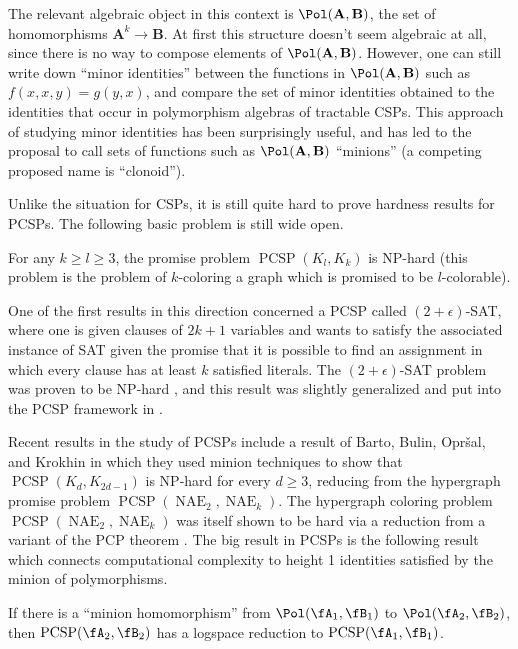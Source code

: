 The relevant algebraic object in this context is $\Pol(\mathbf{A},\mathbf{B})$, the set of homomorphisms $\mathbf{A}^k \rightarrow \mathbf{B}$. At first this structure doesn't seem algebraic at all, since there is no way to compose elements of $\Pol(\mathbf{A},\mathbf{B})$. However, one can still write down ``minor identities'' between the functions in $\Pol(\mathbf{A},\mathbf{B})$ such as $f(x,x,y) = g(y,x)$, and compare the set of minor identities obtained to the identities that occur in polymorphism algebras of tractable CSPs. This approach of studying minor identities has been surprisingly useful, and has led to the proposal to call sets of functions such as $\Pol(\mathbf{A},\mathbf{B})$ ``minions'' (a competing proposed name is ``clonoid'').

Unlike the situation for CSPs, it is still quite hard to prove hardness results for PCSPs. The following basic problem is still wide open.

\begin{conj} For any $k \ge l \ge 3$, the promise problem $\operatorname{PCSP}(K_l,K_k)$ is NP-hard (this problem is the problem of $k$-coloring a graph which is promised to be $l$-colorable).
\end{conj}

One of the first results in this direction concerned a PCSP called $(2+\epsilon)$-SAT, where one is given clauses of $2k+1$ variables and wants to satisfy the associated instance of SAT given the promise that it is possible to find an assignment in which every clause has at least $k$ satisfied literals. The $(2+\epsilon)$-SAT problem was proven to be NP-hard \cite{2+epsilon}, and this result was slightly generalized and put into the PCSP framework in \cite{pcsp-symmetric-boolean}.

Recent results in the study of PCSPs include a result of Barto, Bulin, Opr\v{s}al, and Krokhin \cite{pcsp-coloring-full} in which they used minion techniques to show that $\operatorname{PCSP}(K_d, K_{2d-1})$ is NP-hard for every $d \ge 3$, reducing from the hypergraph promise problem $\operatorname{PCSP}(\operatorname{NAE}_2,\operatorname{NAE}_k)$. The hypergraph coloring problem $\operatorname{PCSP}(\operatorname{NAE}_2,\operatorname{NAE}_k)$ was itself shown to be hard via a reduction from a variant of the PCP theorem \cite{hypergraph-promise-hardness}. The big result in PCSPs is the following result which connects computational complexity to height 1 identities satisfied by the minion of polymorphisms.

\begin{thm} If there is a ``minion homomorphism'' from $\Pol(\fA_1,\fB_1)$ to $\Pol(\fA_2,\fB_2)$, then $\operatorname{PCSP}(\fA_2,\fB_2)$ has a logspace reduction to $\operatorname{PCSP}(\fA_1,\fB_1)$.
\end{thm}


